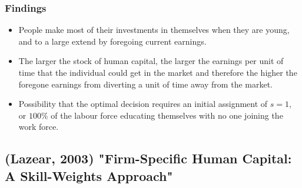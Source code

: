 \documentclass[12pt,a4paper]{article}
\begin{document}
  \subsubsection{Findings}
  \begin{itemize}
    \item People make most of their investments in themselves when they are young, and to a large extend by foregoing current earnings.
    \item The larger the stock of human capital, the larger the earnings per unit of time that the individual could get in the market and therefore the higher the foregone earnings from diverting a unit of time away from the market.
    \item Possibility that the optimal decision requires an initial assignment of $s=1$, or $100\%$ of the labour force educating themselves with no one joining the work force.
  \end{itemize}

  \subsection{(Lazear, 2003) "Firm-Specific Human Capital: A Skill-Weights Approach"} %
\end{document}
